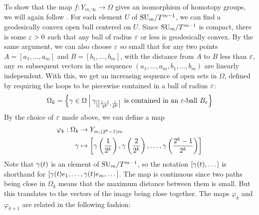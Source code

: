 To show that the map $f : Y_{m,\infty} \to \Omega$
gives an isomorphism of homotopy groups, we will again follow
\cite{milnor}. For each element $U$ of $\mathrm{SU}_{m}/T^{m-1}$, we can find a 
geodesically convex open ball centered on $U$. Since $\mathrm{SU}_{m}/T^{m-1}$
is compact, there is some $\varepsilon > 0$ such that any ball of radius $\varepsilon$
or less is geodesically convex. By the same argument, we can also
choose $\varepsilon$ so small that for any two points $A= [a_1,\dots, a_m]$ and
$B=[b_1,\dots,b_m]$, with the distance from $A$ to $B$ less
than $\varepsilon$, any $m$ subsequent vectors in the sequence
$(a_1,\dots,a_m,b_1,\dots,b_m)$ are linearly independent.
With this, we get an increasing sequence of open sets in $\Omega$,
defined by requiring the loops to be piecewise contained in a ball of
radius $\varepsilon$:
\[ \Omega_k = \left\{ \gamma \in \Omega \: \Big\vert\:
  \gamma_{\left|\left[ \frac{j-1}{2^k},\frac{j}{2^k} \right]\right.} \text{ is
  contained in an $\varepsilon$-ball $B_\varepsilon$}  \right\} \]
By the choice of $\varepsilon$ made above, we can define a map
\begin{align*}
  \varphi_k : \Omega_k &\to Y_{m,(2^k-1)m} \\
  \gamma &\mapsto \left[ \gamma\left(\frac{1}{2^k}\right),
    \gamma\left(\frac{2}{2^k}\right), \dots,
    \gamma\left(\frac{2^k-1}{2^k}\right) \right]
\end{align*}
Note that $\gamma(t)$ is an element of $\mathrm{SU}_{m}/T^{m-1}$, so the notation
$[\gamma(t),\dots]$ is shorthand for $[\gamma(t)e_1,\dots,\gamma(t)e_m,\dots]$.
The map is continuous since two paths being close in $\Omega_k$ means
that the maximum distance between them is small. But this translates
to the vectors of the image being close together. The maps $\varphi_k$
and $\varphi_{k+1}$ are related in the following fashion:

